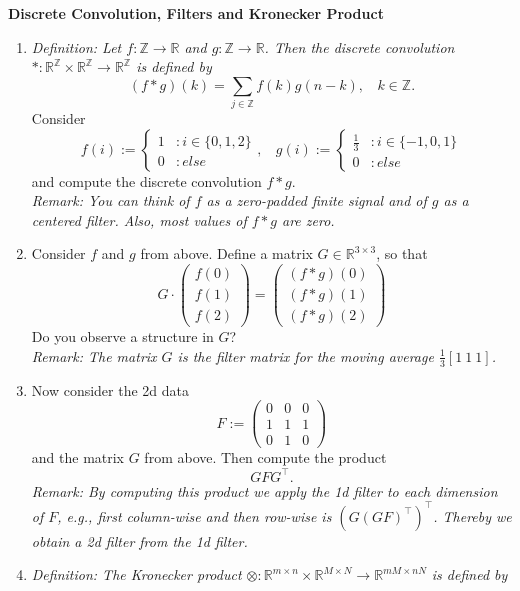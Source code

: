 \textbf{Discrete Convolution, Filters and Kronecker Product}
\begin{enumerate}
	\item \textit{\color{navy}Definition: Let $f\colon\mathbb{Z}\to\mathbb{R}$ and $g\colon\mathbb{Z}\to\mathbb{R}$. Then the discrete convolution $\ast\colon \mathbb{R}^\mathbb{Z}\times \mathbb{R}^\mathbb{Z} \to \mathbb{R}^\mathbb{Z}$ is defined by 
	$$ (f \ast g)(k)  = \sum_{j\in \mathbb{Z}}f(k)g(n-k),~~~~k\in \mathbb{Z}. $$}
	Consider 
	$$
	f(i) := \begin{cases}
	1 &: i \in \{0,1,2\}\\
	0 &: else
	\end{cases},~~~~
	g(i) := \begin{cases}
	\tfrac{1}{3} &: i \in \{-1,0,1\}\\
	0 &: else
	\end{cases}
	$$
	and compute the discrete convolution $f \ast g$.\\
	\textit{Remark: You can think of $f$ as a zero-padded finite signal and of $g$ as a centered filter. Also, most values of $f \ast g$ are zero.}
	\item Consider $f$ and $g$ from above. Define a matrix $G \in \mathbb{R}^{3\times 3}$, so that 
	$$
	G \cdot \begin{pmatrix}
	f(0)\\f(1)\\f(2)
	\end{pmatrix} 
	=
	\begin{pmatrix}
	(f \ast g)(0)\\(f \ast g)(1)\\(f \ast g)(2)
	\end{pmatrix}
	$$
	Do you observe a structure in $G$?\\
	\textit{Remark: The matrix $G$ is the filter matrix for the moving average $\tfrac{1}{3}[1~ 1~ 1]$.}
	\item Now consider the 2d data
	 $$F := \begin{pmatrix}
	 0 & 0 & 0\\1 & 1 & 1\\ 0 & 1 & 0
	 \end{pmatrix} $$
	 and the matrix $G$ from above. Then compute the product
	 $$G F G^\top. $$
	 \textit{Remark: By computing this product we apply the 1d filter to each dimension of $F$, e.g., first column-wise and then row-wise is $(G(GF)^\top)^\top$. Thereby we obtain a 2d filter from the 1d filter.}
	 \item \textit{\color{navy}Definition: The Kronecker product $\otimes\colon \mathbb{R}^{m \times n} \times \mathbb{R}^{M \times N} \to \mathbb{R}^{mM \times nN}$ is defined by
}
\end{enumerate}
